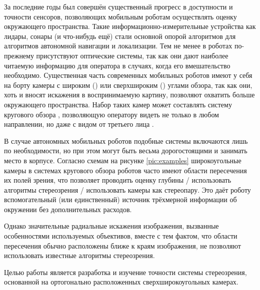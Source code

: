 За последние годы был совершён существенный прогресс в доступности и точности сенсоров, позволяющих мобильным роботам 
осуществлять оценку окружающего пространства. Такие информационно-измерительные устройства как лидары, сонары (и что-нибудь                     %
ещё) стали основной опорой алгоритмов для алгоритмов автономной навигации и локализации. Тем не менее в роботах по-прежнему 
присутствуют оптические системы, так как они дают наиболее читаемую информацию для оператора в случаях, когда его вмешательство 
необходимо. Существенная часть современных мобильных роботов имеют у себя на борту камеры с широким () или сверхшироким ()                      %
углами обзора, так как они, хоть и вносят искажения в воспринимаемую картину, позволяют охватить больше окружающего пространства.               %
Набор таких камер может составлять систему кругового обзора \cite{}, позволяющую оператору видеть не только в любом направлении,                %
но даже с видом от третьего лица \cite{}. 
    
В случае автономных мобильных роботов подобные системы включаются лишь по необходимости, но при этом могут быть весьма 
дорогостоящими и занимать место в корпусе.                                                                                                      %
Согласно схемам на рисунке \ref{pic:examples} широкоугольные камеры в системах кругового обзора роботов часто имеют области                     %
пересечения их полей зрения, что позволяет проводить оценку глубины / использовать алгоритмы стереозрения / использовать камеры как стереопару. %
Это даёт роботу вспомогательный (или единственный) источник трёхмерной информации об окружении без дополнительных расходов.                     %

Однако значительные радиальные искажения изображения, вызванные особенностями используемых объективов, вместе с тем фактом, что области пересечения 
обычно расположены ближе к краям изображения, не позволяют использовать известные алгоритмы стереозрения.                                       %

Целью работы является разработка и изучение точности системы стереозрения, основанной на ортогонально расположенных сверхширокоугольных камерах.

